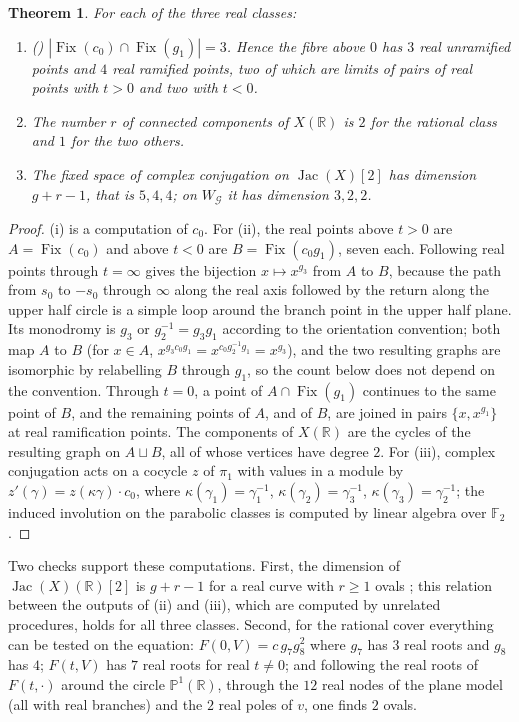 \documentclass[11pt]{amsart}
\newtheorem{theorem}{Theorem}[section]
\theoremstyle{definition}
\newcommand{\RR}{\mathbb{R}}
\newcommand{\FF}{\mathbb{F}}
\newcommand{\PP}{\mathbb{P}}
\newcommand{\Jac}{\operatorname{Jac}}
\newcommand{\Fix}{\operatorname{Fix}}
\newcommand{\cG}{\mathcal{G}}
\begin{document}
\begin{theorem}\label{thm:real}
For each of the three real classes:
\begin{enumerate}[label=\textup{(\roman*)}]
\item \textup{(\cite[Thm.~8.20]{LeLay26})} $|\Fix(c_0)\cap\Fix(g_1)|=3$. Hence the fibre above $0$ has $3$ real unramified points and $4$ real ramified points, two of which are limits of pairs of real points with $t>0$ and two with $t<0$.
\item The number $r$ of connected components of $X(\RR)$ is $2$ for the rational class and $1$ for the two others.
\item The fixed space of complex conjugation on $\Jac(X)[2]$ has dimension $g+r-1$, that is $5,4,4$; on $W_\cG$ it has dimension $3,2,2$.
\end{enumerate}
\end{theorem}
\begin{proof}
(i) is a computation of $c_0$. For (ii), the real points above $t>0$ are $A=\Fix(c_0)$ and above $t<0$ are $B=\Fix(c_0g_1)$, seven each. Following real points through $t=\infty$ gives the bijection $x\mapsto x^{g_3}$ from $A$ to $B$, because the path from $s_0$ to $-s_0$ through $\infty$ along the real axis followed by the return along the upper half circle is a simple loop around the branch point in the upper half plane. Its monodromy is $g_3$ or $g_2^{-1}=g_3g_1$ according to the orientation convention; both map $A$ to $B$ (for $x\in A$, $x^{g_3c_0g_1}=x^{c_0g_2^{-1}g_1}=x^{g_3}$), and the two resulting graphs are isomorphic by relabelling $B$ through $g_1$, so the count below does not depend on the convention. Through $t=0$, a point of $A\cap\Fix(g_1)$ continues to the same point of $B$, and the remaining points of $A$, and of $B$, are joined in pairs $\{x,x^{g_1}\}$ at real ramification points. The components of $X(\RR)$ are the cycles of the resulting graph on $A\sqcup B$, all of whose vertices have degree $2$. For (iii), complex conjugation acts on a cocycle $z$ of $\pi_1$ with values in a module by $z'(\gamma)=z(\kappa\gamma)\cdot c_0$, where $\kappa(\gamma_1)=\gamma_1^{-1}$, $\kappa(\gamma_2)=\gamma_3^{-1}$, $\kappa(\gamma_3)=\gamma_2^{-1}$; the induced involution on the parabolic classes is computed by linear algebra over $\FF_2$.
\end{proof}

Two checks support these computations. First, the dimension of $\Jac(X)(\RR)[2]$ is $g+r-1$ for a real curve with $r\ge1$ ovals \cite{GH81}; this relation between the outputs of (ii) and (iii), which are computed by unrelated procedures, holds for all three classes. Second, for the rational cover everything can be tested on the equation: $F(0,V)=c\,g_7g_8^2$ where $g_7$ has $3$ real roots and $g_8$ has $4$; $F(t,V)$ has $7$ real roots for real $t\neq0$; and following the real roots of $F(t,\cdot)$ around the circle $\PP^1(\RR)$, through the $12$ real nodes of the plane model (all with real branches) and the $2$ real poles of $v$, one finds $2$ ovals.
\end{document}
